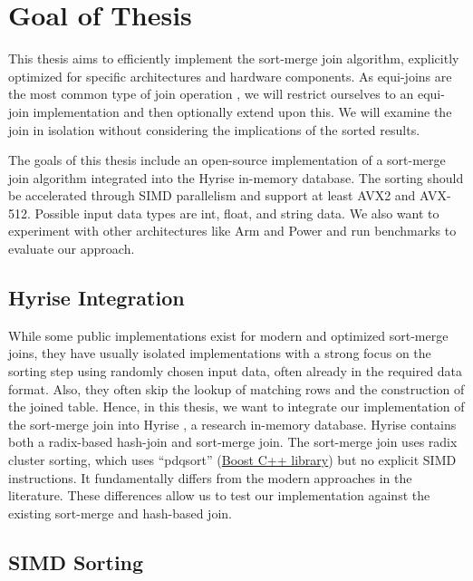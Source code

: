 \section{Goal of Thesis}
\label{sec:goal}

This thesis aims to efficiently implement the sort-merge join algorithm, explicitly optimized 
for specific architectures and hardware components. As equi-joins are the most common type of 
join operation \cite{DBLP:conf/cloud/BlanasP13}, we will restrict ourselves to an equi-join implementation and then optionally
extend upon this. We will examine the join in isolation without considering the implications of the sorted results.

The goals of this thesis include an open-source implementation of a sort-merge join algorithm
integrated into the Hyrise in-memory database. The sorting should be accelerated through SIMD
parallelism and support at least AVX2 and AVX-512. Possible input data types are int, float, and string
data. We also want to experiment with other architectures like Arm and Power and run benchmarks 
to evaluate our approach.

\subsection{Hyrise Integration}
While some public implementations
exist for modern and optimized sort-merge joins, they have usually isolated implementations with a strong
focus on the sorting step using randomly chosen input data, often already in the required data format. 
Also, they often skip the lookup of matching rows and the construction of the joined table.
Hence, in this thesis, we want to integrate our implementation of the sort-merge join into Hyrise
\cite{DBLP:conf/edbt/DreselerK0KUP19},
a research in-memory database. Hyrise contains both a radix-based hash-join and sort-merge join.
The sort-merge join uses radix cluster sorting, which uses ``pdqsort'' (\href{https://www.boost.org/}{Boost C++ library})
but no explicit SIMD instructions. It fundamentally differs from the modern approaches in the literature.
These differences allow us to test our implementation against the existing sort-merge and hash-based join.

\subsection{SIMD Sorting}

